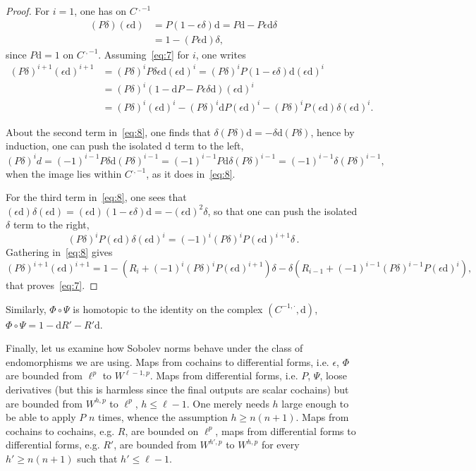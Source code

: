 \documentclass[11pt]{article}
\theoremstyle{definition}
\numberwithin{equation}{section}
\numberwithin{figure}{section}
\numberwithin{table}{section}
\newcommand{\dd}{\mathrm{d}}
\begin{document}
\begin{proof}
For $i=1$, one has on $C^{\cdot,-1}$
\begin{align*}
(P \delta) (\epsilon \dd) & = P(1 - \epsilon \delta)\dd = P\dd - P\epsilon \dd \delta \\
& = 1 - (P\epsilon \dd) \delta,
\end{align*}
since $P\dd = 1$ on $C^{\cdot,-1}$. Assuming~\eqref{eq:7} for $i$, one writes
\begin{align}
(P\delta)^{i+1} (\epsilon \dd)^{i+1} & = (P \delta)^i P\delta
\epsilon \dd (\epsilon \dd)^i = (P \delta)^i P(1 - \epsilon
\delta) \dd (\epsilon \dd)^i \nonumber \\
& = (P
\delta)^i (1 - \dd P - P \epsilon \delta \dd) (\epsilon \dd)^i
\nonumber \\
& = (P \delta)^i (\epsilon \dd)^i - (P \delta)^i \dd P (\epsilon \dd)^i - (P \delta)^i P (\epsilon \dd) \delta (\epsilon \dd)^i.\label{eq:8}
\end{align}

About the second term in~\eqref{eq:8}, one finds that $\delta(P\delta) \dd = - \delta \dd (P\delta)$, hence by induction, one can push the isolated $\dd$ term to the left,
\[
(P \delta)^i d = (-1)^{i-1} P\delta \dd (P\delta)^{i-1} = (-1)^{i-1} P\dd \delta (P\delta)^{i-1} = (-1)^{i-1}\delta (P\delta)^{i-1},
\]
when the image lies within $C^{\cdot,-1}$, as it does in~\eqref{eq:8}.

For the third term in~\eqref{eq:8}, one sees that $(\epsilon \dd) \delta (\epsilon \dd) = (\epsilon \dd)(1 - \epsilon \delta) \dd = - (\epsilon \dd)^2 \delta$, so that one can push the isolated $\delta$ term to the right,
\[
(P \delta)^i P (\epsilon \dd) \delta (\epsilon \dd)^i = (-1)^i (P \delta)^i P (\epsilon \dd)^{i+1} \delta \,.
\]
Gathering in~\eqref{eq:8} gives
\[
(P\delta)^{i+1} (\epsilon \dd)^{i+1} = 1 - (R_i + (-1)^i (P\delta)^i P (\epsilon \dd)^{i+1}) \delta - \delta (R_{i-1} + (-1)^{i-1} (P\delta)^{i-1} P (\epsilon \dd)^i),
\]
that proves~\eqref{eq:7}.
\end{proof}

Similarly, $\Phi\circ\Psi$ is homotopic to the identity on the complex $(C^{-1,\cdot},\dd)$, $\Phi\circ\Psi=1-\dd R'-R'\dd$.

Finally, let us examine how Sobolev norms behave under the class of endomorphisms we are using. Maps from cochains to differential forms, i.e. $\epsilon$, $\Phi$ are bounded from $\ell^p$ to $W^{\ell-1,p}$. Maps from differential forms, i.e. $P$, $\Psi$, loose derivatives (but this is harmless since the final outputs are scalar cochains) but are bounded from $W^{h,p}$ to $\ell^p$, $h\leq \ell-1$. One merely needs $h$ large enough to be able to apply $P$ $n$ times, whence the assumption $h\geq n(n+1)$. Maps from cochains to cochains, e.g. $R$, are bounded on $\ell^p$, maps from differential forms to differential forms, e.g. $R'$, are bounded from $W^{h',p}$ to $W^{h,p}$ for every $h'\geq n(n+1)$ such that $h'\leq \ell-1$.
\end{document}
